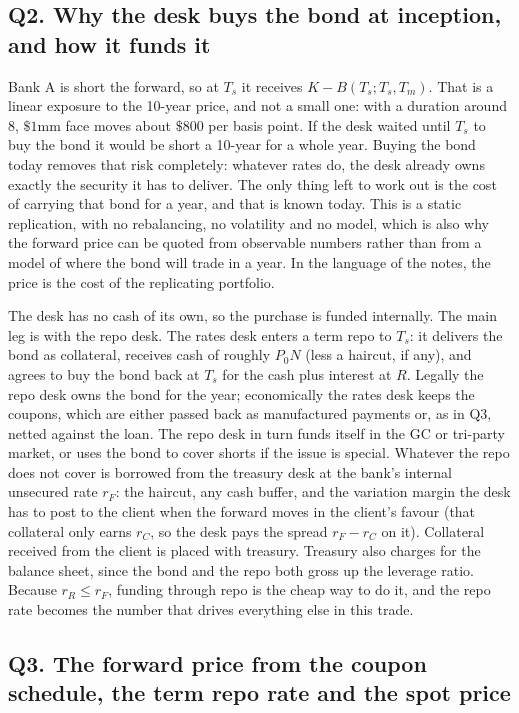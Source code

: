 \documentclass[11pt]{article}
\begin{document}
\subsection*{Q2. Why the desk buys the bond at inception, and how it funds it}

Bank A is short the forward, so at $T_s$ it receives $K - B(T_s;T_s,T_m)$. That is a linear exposure to the 10-year price, and not a small one: with a duration around 8, $\$1$mm face moves about $\$800$ per basis point. If the desk waited until $T_s$ to buy the bond it would be short a 10-year for a whole year. Buying the bond today removes that risk completely: whatever rates do, the desk already owns exactly the security it has to deliver. The only thing left to work out is the cost of carrying that bond for a year, and that is known today. This is a static replication, with no rebalancing, no volatility and no model, which is also why the forward price can be quoted from observable numbers rather than from a model of where the bond will trade in a year. In the language of the notes, the price is the cost of the replicating portfolio.

The desk has no cash of its own, so the purchase is funded internally. The main leg is with the repo desk. The rates desk enters a term repo to $T_s$: it delivers the bond as collateral, receives cash of roughly $P_0 N$ (less a haircut, if any), and agrees to buy the bond back at $T_s$ for the cash plus interest at $R$. Legally the repo desk owns the bond for the year; economically the rates desk keeps the coupons, which are either passed back as manufactured payments or, as in Q3, netted against the loan. The repo desk in turn funds itself in the GC or tri-party market, or uses the bond to cover shorts if the issue is special. Whatever the repo does not cover is borrowed from the treasury desk at the bank's internal unsecured rate $r_F$: the haircut, any cash buffer, and the variation margin the desk has to post to the client when the forward moves in the client's favour (that collateral only earns $r_C$, so the desk pays the spread $r_F - r_C$ on it). Collateral received from the client is placed with treasury. Treasury also charges for the balance sheet, since the bond and the repo both gross up the leverage ratio. Because $r_R \le r_F$, funding through repo is the cheap way to do it, and the repo rate becomes the number that drives everything else in this trade.

\subsection*{Q3. The forward price from the coupon schedule, the term repo rate and the spot price}
\end{document}
